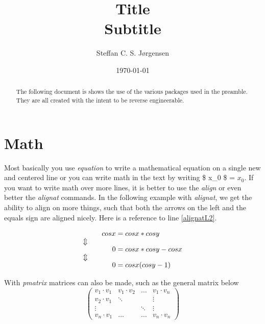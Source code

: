 \documentclass[a4, english]{article}
\begin{document}
    \title{\huge Title \\ \large Subtitle}
    
    \author{Steffan C. S. Jørgensen}
    
    \date{\today}
    
    \chead{}

\maketitle

\begin{abstract}
\noindent The following document is shows the use of the various packages used in the preamble. They are all created with the intent to be reverse engineerable.
\end{abstract}

\tableofcontents

\newpage
\section{Math} \label{sec:math}
Most basically you use \emph{equation} to write a mathematical equation on a single new and centered line or you can write math in the text by writing \$ x\_0 \$ = $x_0$. If you want to write math over more lines, it is better to use the \emph{align} or even better the \emph{alignat} commands. In the following example with \emph{alignat}, we get the ability to align on more things, such that both the arrows on the left and the equals sign are aligned nicely. Here is a reference to line \ref{alignatL2}.

\begin{alignat}{2}
&& cos x &= cos x * cos y \label{alignatL1}
\\ \ArrowBetweenLines
&& 0 &= cos x * cos y - cos x \label{alignatL2}
\\ \ArrowBetweenLines
&& 0 &= cos x (cos y - 1) \label{alignatL3}
\end{alignat}

With \emph{pmatrix} matrices can also be made, such as the general matrix below
\begin{equation*}
	\begin{pmatrix}
		v_1 \cdot v_1 & v_1 \cdot v_2 & \dots & v_1 \cdot v_n
\\		v_2 \cdot v_1 & \ddots & & \vdots
\\		\vdots & & \ddots & \vdots
\\		v_n \cdot v_1 & \dots & \dots & v_n \cdot v_n
	\end{pmatrix}
\end{equation*}
\end{document}

